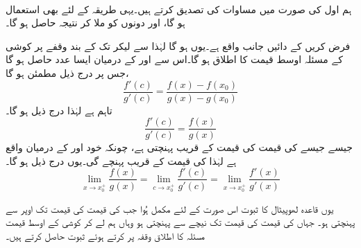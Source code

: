 \\
ہم اول    کی صورت میں مساوات   کی تصدیق کرتے ہیں۔یہی طریقہ  کے لئے بھی  استعمال  ہو گا، اور دونوں کو   ملا کر نتیجہ    حاصل ہو گا۔

فرض کریں  کے دائیں جانب    واقع ہے۔یوں  ہو گا لہٰذا  سے لیکر   تک کے بند وقفے پر کوشی کے  مسئلہ اوسط قیمت کا اطلاق ہو گا۔اس سے  اور  کے  درمیان ایسا عدد  حاصل ہو گا جس پر درج ذیل مطمئن ہو گا،
\[\frac{f'(c)}{g'(c)}=\frac{f(x)-f(x_0)}{g(x)-g(x_0)}\]
تاہم   ہے لہٰذا درج ذیل   ہو گا۔
\[\frac{f'(c)}{g'(c)}=\frac{f(x)}{g(x)}\]
جیسے جیسے  کی قیمت  کی قیمت کے قریب پہنچتی ہے، چونکہ  خود  اور  کے درمیان  واقع ہے  لہٰذا     کی قیمت  کے قریب پہنچے گی۔یوں درج ذیل ہو گا۔
\[\lim_{x\to x_0^+}\frac{f(x)}{g(x)}=\lim_{c\to x_0^+}\frac{f'(c)}{g'(c)}=\lim_{x\to x_0^+}\frac{f'(x)}{g'(x)}\]

یوں   قاعدہ    لھوپیٹال   کا ثبوت اس صورت  کے لئے مکمل ہُوا جب  کی قیمت  کی قیمت  تک اوپر سے پہنچتی ہو۔ جہاں  کی قیمت  کی قیمت تک نیچے  سے  پہنچتی ہو وہاں ہم    لے کر  کوشی کے اوسط قیمت مسئلہ کا اطلاق وقفہ پر کرتے ہوئے ثبوت حاصل کرتے ہیں۔

